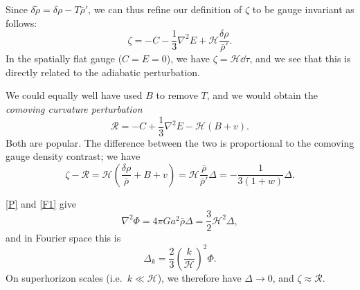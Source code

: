 \documentclass{jknotes}
\begin{document}
Since \(\delta\tilde{\rho} = \delta\rho-T\bar\rho'\), we can thus refine our definition of \(\zeta\) to be gauge invariant as follows:
\begin{equation}
    \zeta = -C - \frac13\nabla^2E + \mathcal{H}\frac{\delta\rho}{\bar\rho'}.
\end{equation}
In the spatially flat gauge (\(C=E=0\)), we have \(\zeta=\mathcal{H}\dd{\tau}\), and we see that this is directly related to the adiabatic perturbation.

We could equally well have used \(B\) to remove \(T\), and we would obtain the \emph{comoving curvature perturbation}
\begin{equation}
    \mathcal{R} = -C + \frac13\nabla^2E-\mathcal{H}(B+v).
\end{equation}
Both are popular. The difference between the two is proportional to the comoving gauge density contrast; we have
\begin{equation}
    \zeta-\mathcal{R} = \mathcal{H}\left(\frac{\delta\rho}{\bar\rho} + B + v\right) = \mathcal{H}\frac{\bar\rho}{\bar\rho'}\Delta = -\frac1{3(1+w)}\Delta.
\end{equation}

\eqref{P} and \eqref{F1} give
\begin{equation}
    \nabla^2\Phi = 4\pi G a^2\bar\rho\Delta = \frac{3}{2}\mathcal{H}^2\Delta,
\end{equation}
and in Fourier space this is
\begin{equation}
    \Delta_k = \frac23\left(\frac{k}{\mathcal{H}}\right)^2\Phi.
\end{equation}
On superhorizon scales (i.e.\ \(k \ll \mathcal{H}\)), we therefore have \(\Delta \to 0\), and \(\zeta \approx \mathcal{R}\).
\end{document}
